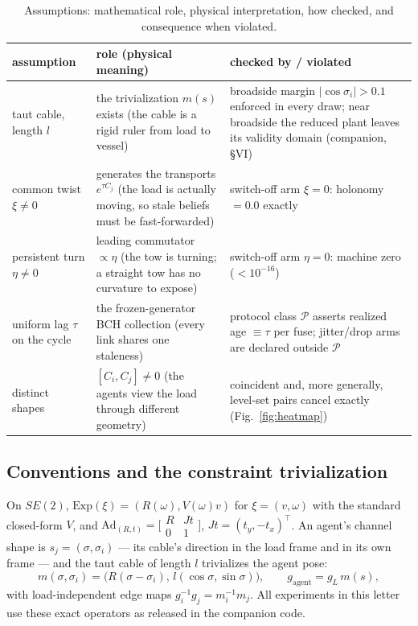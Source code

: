\documentclass[letterpaper, 10pt, journal]{IEEEtran}
\begin{document}
\begin{table}[t]
\centering
\caption{Assumptions: mathematical role, physical interpretation, how
checked, and consequence when violated.}
\label{tab:assume}
\begin{tabular}{p{1.6cm}p{2.7cm}p{3.4cm}}
\toprule
assumption & role (physical meaning) & checked by / violated \\
\midrule
taut cable, length $l$ & the trivialization $m(s)$ exists (the cable is a
rigid ruler from load to vessel) & broadside margin
$|\cos\sigma_i| > 0.1$ enforced in every draw; near broadside the reduced
plant leaves its validity domain (companion, \S VI) \\
common twist $\xi \ne 0$ & generates the transports $e^{\tau C_j}$ (the load
is actually moving, so stale beliefs must be fast-forwarded) &
switch-off arm $\xi = 0$: holonomy $= 0.0$ exactly \\
persistent turn $\eta \ne 0$ & leading commutator $\propto \eta$ (the tow is
turning; a straight tow has no curvature to expose) &
switch-off arm $\eta = 0$: machine zero ($<10^{-16}$) \\
uniform lag $\tau$ on the cycle & the frozen-generator BCH collection (every
link shares one staleness) &
protocol class $\mathcal{P}$ asserts realized age $\equiv \tau$ per fuse;
jitter/drop arms are declared outside $\mathcal{P}$ \\
distinct shapes & $[C_i, C_j] \ne 0$ (the agents view the load through
different geometry) & coincident and, more generally,
level-set pairs cancel exactly (Fig.~\ref{fig:heatmap}) \\
\bottomrule
\end{tabular}
\end{table}

\subsection{Conventions and the constraint trivialization}
On $SE(2)$, $\mathrm{Exp}(\xi) = (R(\omega), V(\omega)v)$ for
$\xi = (v,\omega)$ with the standard closed-form $V$, and
$\mathrm{Ad}_{(R,t)} = \bigl[\begin{smallmatrix} R & Jt\\ 0 &
1\end{smallmatrix}\bigr]$, $Jt = (t_y, -t_x)^\top$. An agent's channel shape
is $s_j = (\sigma, \sigma_i)$ --- its cable's direction in the load frame and
in its own frame --- and the taut cable of length $l$ trivializes the agent
pose:
\begin{equation}
m(\sigma, \sigma_i) = \bigl(R(\sigma-\sigma_i),\, l(\cos\sigma,
\sin\sigma)\bigr), \qquad g_{\mathrm{agent}} = g_L\, m(s),
\end{equation}
with load-independent edge maps $g_i^{-1}g_j = m_i^{-1} m_j$. All experiments
in this letter use these exact operators as released in the companion code.
\end{document}

